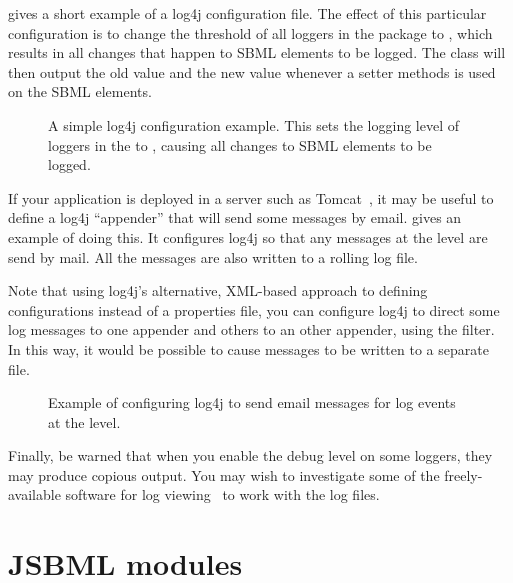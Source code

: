  gives a short example of a log4j
configuration file.  The effect of this particular configuration is to
change the threshold of all loggers in the 
package to , which results in all changes that happen to SBML
elements to be logged. The class \SimpleTreeNodeChangeListener{}  will then
output the old value and the new value whenever a setter methods is used on
the SBML elements.

\begin{figure}[t]
  \caption{A simple log4j configuration example.  This sets the logging
    level of loggers in the  to ,
    causing all changes to SBML elements to be logged.}
  \label{fig:log4j-simple-example}
\end{figure}

If your application is deployed in a server such as Tomcat~\cite{tomcat},
it may be useful to define a log4j ``appender'' that will send some
messages by email.   gives an example
of doing this.  It configures log4j so that any messages at the
 level  are send by mail. All the messages are
also written to a rolling log file.

Note that using log4j's alternative, XML-based approach to defining
configurations instead of a properties file, you can configure log4j to
direct some log messages %
to one appender and others to an other appender, using the
 filter. In this way, it would be possible to cause
 messages to be written to a separate file.

\begin{figure}[t]
  \caption{Example of configuring log4j to send email messages for log
    events at the  level.}
  \label{fig:log4j-email-example}
\end{figure}


Finally, be warned that when you enable the debug level  on
some loggers, they may produce copious output.  You may wish to investigate
some of the freely-available software for log
viewing~\cite{logViewersWebpage} to work with the log files.


\section{JSBML modules}
\label{sec:jsbml-modules-details}

